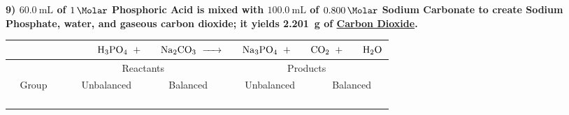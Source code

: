 \documentclass[12pt, oneside, letterpaper]{book}
\begin{document}
\textbf{9) $\qty{60.0}{\milli\liter}$ of $\qty{1}{\Molar}$ Phosphoric Acid is mixed with $\qty{100.0}{\milli\liter}$ of $\qty{0.800}{\Molar}$ Sodium Carbonate to create Sodium Phosphate, water, and gaseous carbon dioxide; it yields \qty{2.201}{\gram} of \underline{Carbon Dioxide}.}
\begin{table}[H]
\centering
\begin{tabular}{|c||c|c||c|c|} 
\multicolumn{5}{c}{$\phantom{Group 123456789012}
    \ce{H3PO4} \ + \ 
    \phantom{123} \ce{Na2CO3} \ \ce{->} \ 
    \phantom{123} \ce{Na3PO4} \ + \ 
    \phantom{123} \ce{CO2} \ + \
    \phantom{123} \ce{H2O}$}\\
 \hline
    & \multicolumn{2}{c||}{Reactants} & \multicolumn{2}{c|}{Products} \\
 \hline
 Group & Unbalanced & Balanced & Unbalanced & Balanced\\ 
 \hline\hline
   & & & & \\
 \hline
   & & & & \\
 \hline
  & & & & \\
 \hline
  & & & & \\[1ex] 
 \hline
\end{tabular}
\end{table}
\end{document}
